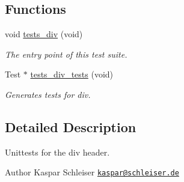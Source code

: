\subsection*{Functions}
\begin{DoxyCompactItemize}
\item 
void \hyperlink{group__unittests_ga1161adbe65ee71e46440423762d1ed8b}{tests\+\_\+div} (void)
\begin{DoxyCompactList}\small\item\em The entry point of this test suite. \end{DoxyCompactList}\item 
Test $\ast$ \hyperlink{group__unittests_ga8e77add06e39b1bb9dbf9004f2ea4c95}{tests\+\_\+div\+\_\+tests} (void)
\begin{DoxyCompactList}\small\item\em Generates tests for div. \end{DoxyCompactList}\end{DoxyCompactItemize}


\subsection{Detailed Description}
Unittests for the {\ttfamily div} header. 

\begin{DoxyAuthor}{Author}
Kaspar Schleiser \href{mailto:kaspar@schleiser.de}{\tt kaspar@schleiser.\+de} 
\end{DoxyAuthor}
